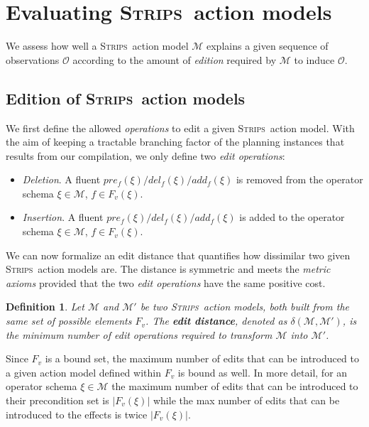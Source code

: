 \documentclass[3p,times]{elsarticle}
\newtheorem{mydefinition}[mytheorem]{Definition}
\newcommand{\strips}{\textsc{Strips}}     %
\begin{document}
\section{Evaluating \strips\ action models}
\label{sec:Section6}
We assess how well a \strips\ action model $\mathcal{M}$ explains a given sequence of observations $\mathcal{O}$ according to the amount of {\em edition} required by $\mathcal{M}$ to induce $\mathcal{O}$. %

\subsection{Edition of \strips\ action models}

We first define the allowed \emph{operations} to edit a given \strips\ action model. With the aim of keeping a tractable branching factor of the planning instances that results from our compilation, we only define two {\em edit operations}:
\begin{itemize}
\item {\em Deletion}. A fluent $pre_f(\xi)/del_f(\xi)/add_f(\xi)$ is removed from the operator schema $\xi\in\mathcal{M}$, $f\in F_v(\xi)$.
\item {\em Insertion}. A fluent $pre_f(\xi)/del_f(\xi)/add_f(\xi)$ is added to the operator schema $\xi\in\mathcal{M}$, $f\in F_v(\xi)$.
\end{itemize}

We can now formalize an edit distance that quantifies how dissimilar two given \strips\ action models are. The distance is symmetric and meets the {\em metric axioms} provided that the two {\em edit operations} have the same positive cost.

\begin{mydefinition}
Let $\mathcal{M}$ and $\mathcal{M}'$ be two \strips\ action models, both built from the same set of possible elements $F_v$. The {\bf edit distance}, denoted as $\delta(\mathcal{M},\mathcal{M}')$, is the minimum number of {\em edit operations} required to transform $\mathcal{M}$ into $\mathcal{M}'$.
\end{mydefinition}

Since $F_v$ is a bound set, the maximum number of edits that can be introduced to a given action model defined within $F_v$ is bound as well. In more detail, for an operator schema $\xi\in\mathcal{M}$ the maximum number of edits that can be introduced to their precondition set is $|F_v(\xi)|$ while the max number of edits that can be introduced to the effects is twice $|F_v(\xi)|$.
\end{document}
